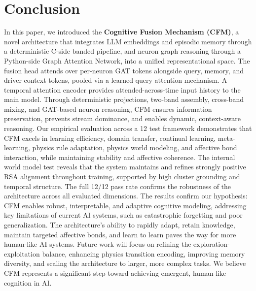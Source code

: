 \documentclass[12pt]{article}
\begin{document}
\section{Conclusion}
\label{sec:conclusion}
In this paper, we introduced the \textbf{Cognitive Fusion Mechanism
(CFM)}, a novel architecture that integrates LLM embeddings and
episodic memory through a deterministic C-side banded pipeline, and
neuron graph reasoning through a Python-side Graph Attention Network,
into a unified representational space. The fusion head attends over
per-neuron GAT tokens alongside query, memory, and driver context
tokens, pooled via a learned-query attention mechanism. A temporal
attention encoder provides attended-across-time input history to the
main model. Through deterministic projections, two-band assembly,
cross-band mixing, and GAT-based neuron reasoning, CFM ensures
information preservation, prevents stream dominance, and enables
dynamic, context-aware reasoning. Our empirical evaluation across a
12 test framework demonstrates that CFM excels in learning efficiency,
domain transfer, continual learning, meta-learning, physics rule
adaptation, physics world modeling, and affective bond interaction,
while maintaining stability and affective coherence. The internal
world model test reveals that the system maintains and refines strongly
positive RSA alignment throughout training, supported by high cluster
grounding and temporal structure. The full 12/12 pass rate confirms
the robustness of the architecture across all evaluated dimensions.
The results confirm our hypothesis: CFM enables robust, interpretable,
and adaptive cognitive modeling, addressing key limitations of current
AI systems, such as catastrophic forgetting and poor generalization.
The architecture's ability to rapidly adapt, retain knowledge, maintain
targeted affective bonds, and learn to learn paves the way for more
human-like AI systems. Future work will focus on refining the
exploration-exploitation balance, enhancing physics transition encoding,
improving memory diversity, and scaling the architecture to larger,
more complex tasks. We believe CFM represents a significant step toward
achieving emergent, human-like cognition in AI.
\end{document}
